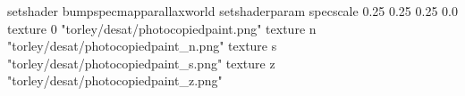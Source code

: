setshader bumpspecmapparallaxworld
setshaderparam specscale 0.25 0.25 0.25 0.0
texture 0 "torley/desat/photocopiedpaint.png"
texture n "torley/desat/photocopiedpaint_n.png"
texture s "torley/desat/photocopiedpaint_s.png"
texture z "torley/desat/photocopiedpaint_z.png"


